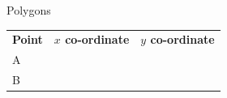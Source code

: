 \begin{exercises}{Polygons}
\begin{figure}[H]
\begin{center}
      \vspace{2pt}
    \vspace{.1in}
    
    \end{center}

 \end{figure}   

    \addtocounter{footnote}{-0}
    
        \par 
        
    
          \begin{table}[H]
        
    
        \begin{center}
      
      \label{m39358*id70670}
      
    \noindent
      \tablelasttail{}
      \begin{xtabular}[t]{|l|l|l|}\hline
    
    
        
                  \textbf{Point}
                 &
    
    
        
                  \textbf{$x$ co-ordinate}
                 &
    
    
        
                  \textbf{$y$ co-ordinate}
     \tabularnewline{}
    
    
        A &
    
    
         &
    
    
     \tabularnewline{}
    
    
        B &
    
    
         &
    
    
     \tabularnewline{}
    

\end{xtabular}
\end{center}
\end{table}
\end{exercises}
